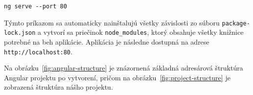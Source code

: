 \begin{verbatim}
ng serve --port 80
\end{verbatim}

Týmto príkazom sa automaticky nainštalujú všetky závislosti zo súboru \texttt{package-lock.json} a vytvorí sa priečinok \texttt{node\_modules}, ktorý obsahuje všetky knižnice potrebné na beh aplikácie.
 Aplikácia je následne dostupná na adrese \texttt{http://localhost:80}.

Na obrázku~\ref{fig:angular-structure} je znázornená základná adresárová štruktúra Angular projektu po vytvorení, pričom na obrázku~\ref{fig:project-structure} je zobrazená štruktúra nášho projektu.

\begin{figure}[H]
  \centering
  \begin{minipage}[t]{0.48\textwidth}
    \centering

\end{minipage}
\end{figure}
